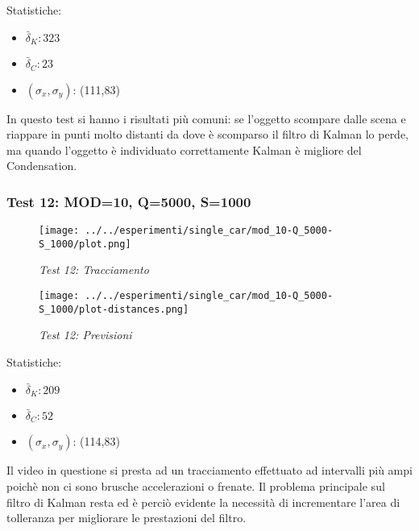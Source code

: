 Statistiche:
\begin{itemize}
\item \begin{math} \bar \delta_K: 323  \end{math}
\item \begin{math} \bar \delta_C: 23 \end{math}
\item \begin{math}(\sigma_x,\sigma_y)\end{math}: (111,83)
\end{itemize}

In questo test si hanno i risultati più comuni: se l'oggetto scompare dalle scena e riappare in punti molto distanti da dove è scomparso il filtro di Kalman lo perde, ma quando l'oggetto è individuato correttamente Kalman è migliore del Condensation. 

\newpage
\subsubsection{Test 12: MOD=10, Q=5000, S=1000}

\begin{figure}[hb]
\centering
\texttt{[image: ../../esperimenti/single\_car/mod\_10-Q\_5000-S\_1000/plot.png]}
\caption{\textit{Test 12: Tracciamento}}
\end{figure}

\begin{figure}[hb]
\centering
\texttt{[image: ../../esperimenti/single\_car/mod\_10-Q\_5000-S\_1000/plot-distances.png]}
\caption{\textit{Test 12: Previsioni}}
\end{figure}

Statistiche:
\begin{itemize}
\item \begin{math} \bar \delta_K:  209 \end{math}
\item \begin{math} \bar \delta_C:  52 \end{math}
\item \begin{math}(\sigma_x,\sigma_y)\end{math}: (114,83)
\end{itemize}

Il video in questione si presta ad un tracciamento effettuato ad intervalli più ampi poichè non ci sono brusche accelerazioni o frenate. Il problema principale sul filtro di Kalman resta ed è perciò evidente la necessità di incrementare l'area di tolleranza per migliorare le prestazioni del filtro. 

